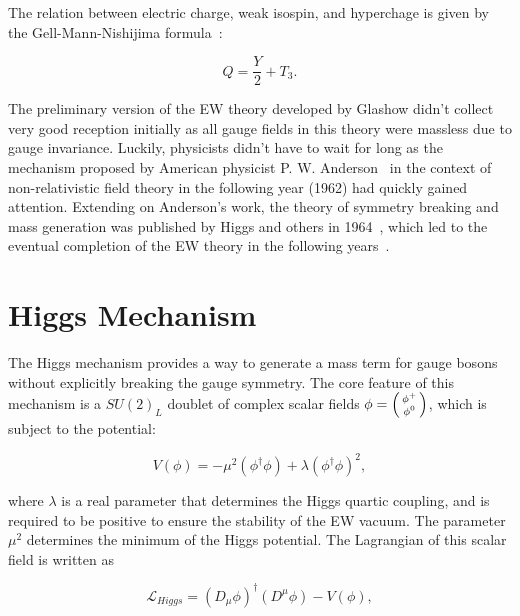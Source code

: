 The relation between electric charge, weak isospin, and hyperchage is given by the Gell-Mann-Nishijima formula~\cite{Nakano:1953zz,Gell-Mann:1956iqa}:

\begin{equation}
Q=\frac{Y}{2}+T_{3}.
\end{equation}

The preliminary version of the \ac{EW} theory developed by Glashow didn't collect very good reception initially as all gauge fields in this theory were massless due to gauge invariance. Luckily, physicists didn't have to wait for long as the mechanism proposed by American physicist P. W. Anderson~\cite{Anderson:1963pc} in the context of non-relativistic field theory in the following year (1962) had quickly gained attention. Extending on Anderson's work, the theory of symmetry breaking and mass generation was published by Higgs and others in 1964~\cite{PhysRevLett.13.321,PhysRevLett.13.508,PhysRevLett.13.585}, which led to the eventual completion of the \ac{EW} theory in the following years~\cite{Salam:1964ry,Weinberg:1967tq}.

\section{Higgs Mechanism}
\label{sec:Higgs}

The Higgs mechanism provides a way to generate a mass term for gauge bosons without explicitly breaking the gauge symmetry. The core feature of this mechanism is a $SU(2)_{L}$ doublet of complex scalar fields $\phi=\begin{psmallmatrix}\phi^{+}\\\phi^{0}\end{psmallmatrix}$, which is subject to the potential:

\begin{equation}
V(\phi)=-\mu^2(\phi^{\dagger}\phi)+\lambda(\phi^{\dagger}\phi)^2,
\end{equation}

where $\lambda$ is a real parameter that determines the Higgs quartic coupling, and is required to be positive to ensure the stability of the \ac{EW} vacuum. The parameter $\mu^2$ determines the minimum of the Higgs potential. The Lagrangian of this scalar field is written as 

\begin{equation}
\mathcal{L}_{Higgs}=(D_{\mu}\phi)^{\dagger}(D^{\mu}\phi)-V(\phi),
\end{equation}

